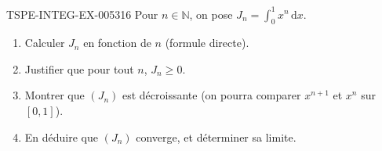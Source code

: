 \begin{exercice}{TSPE-INTEG-EX-005}{3}{16}
Pour $n \in \mathbb{N}$, on pose $J_n = \displaystyle\int_0^1 x^n\,\mathrm{d}x$.
\begin{enumerate}
  \item Calculer $J_n$ en fonction de $n$ (formule directe).
  \item Justifier que pour tout $n$, $J_n \geq 0$.
  \item Montrer que $(J_n)$ est décroissante (on pourra comparer $x^{n+1}$ et $x^n$ sur $[0,1]$).
  \item En déduire que $(J_n)$ converge, et déterminer sa limite.
\end{enumerate}
\end{exercice}
